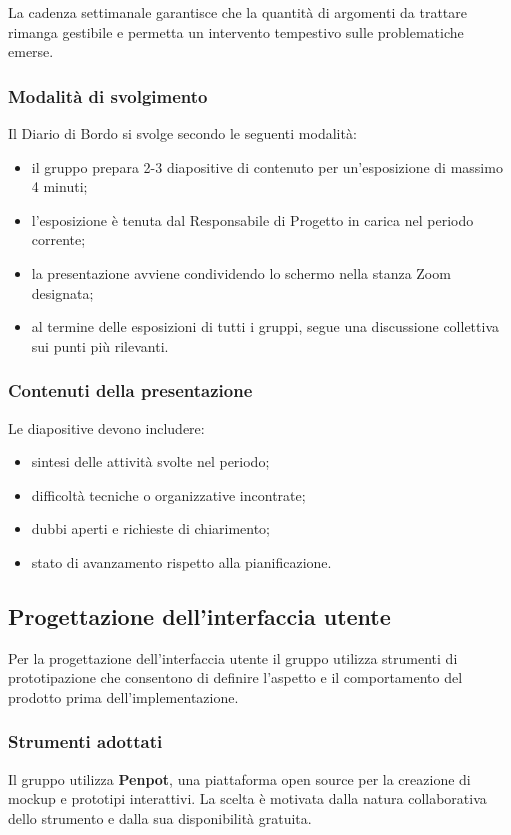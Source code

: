 \documentclass[a4paper, 11pt, oneside]{scrartcl} %
\begin{document}
\noindent
La cadenza settimanale garantisce che la quantità di argomenti da trattare rimanga gestibile e permetta un intervento tempestivo sulle problematiche emerse.

\subsubsection{Modalità di svolgimento}
Il Diario di Bordo si svolge secondo le seguenti modalità:
\begin{itemize}
    \item il gruppo prepara 2-3 diapositive di contenuto per un'esposizione di massimo 4 minuti;
    \item l'esposizione è tenuta dal Responsabile di Progetto in carica nel periodo corrente;
    \item la presentazione avviene condividendo lo schermo nella stanza Zoom designata;
    \item al termine delle esposizioni di tutti i gruppi, segue una discussione collettiva sui punti più rilevanti.
\end{itemize}

\subsubsection{Contenuti della presentazione}
Le diapositive devono includere:
\begin{itemize}
    \item sintesi delle attività svolte nel periodo;
    \item difficoltà tecniche o organizzative incontrate;
    \item dubbi aperti e richieste di chiarimento;
    \item stato di avanzamento rispetto alla pianificazione.
\end{itemize}

\subsection{Progettazione dell'interfaccia utente}
Per la progettazione dell'interfaccia utente il gruppo utilizza strumenti di prototipazione che consentono di definire l'aspetto e il comportamento del prodotto prima dell'implementazione.

\subsubsection{Strumenti adottati}
Il gruppo utilizza \textbf{Penpot}{\scriptsize{}}, una piattaforma open source per la creazione di mockup e prototipi interattivi.
La scelta è motivata dalla natura collaborativa dello strumento e dalla sua disponibilità gratuita.
\end{document}
